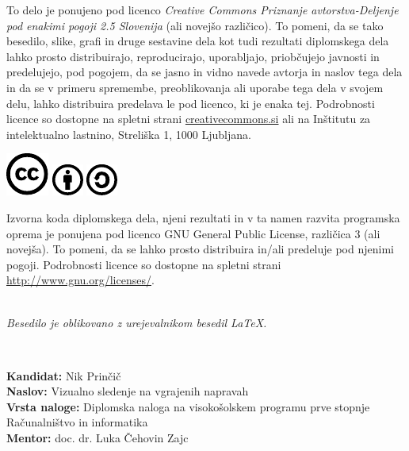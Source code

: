 \documentclass[a4paper,12pt,openright]{book}
\newcommand{\clearemptydoublepage}{\newpage{\pagestyle{empty}\cleardoublepage}}
\newcommand{\CcImageCc}[1]{%
	\includegraphics[scale=#1]{./img/common/cc_cc_30.pdf}%
}
\newcommand{\CcImageBy}[1]{%
	\includegraphics[scale=#1]{./img/common/cc_by_30.pdf}%
}
\newcommand{\CcImageSa}[1]{%
	\includegraphics[scale=#1]{./img/common/cc_sa_30.pdf}%
}
\begin{document}
\newpage
\thispagestyle{empty}

\vspace*{5cm}
{\small \noindent
    To delo je ponujeno pod licenco \textit{Creative Commons Priznanje avtorstva-Deljenje pod enakimi pogoji 2.5 Slovenija} (ali novej\v so razli\v cico).
    To pomeni, da se tako besedilo, slike, grafi in druge sestavine dela kot tudi rezultati diplomskega dela lahko prosto distribuirajo,
    reproducirajo, uporabljajo, priobčujejo javnosti in predelujejo, pod pogojem, da se jasno in vidno navede avtorja in naslov tega
    dela in da se v primeru spremembe, preoblikovanja ali uporabe tega dela v svojem delu, lahko distribuira predelava le pod
    licenco, ki je enaka tej.
    Podrobnosti licence so dostopne na spletni strani \href{http://creativecommons.si}{creativecommons.si} ali na Inštitutu za
    intelektualno lastnino, Streliška 1, 1000 Ljubljana.

    \vspace*{1cm}
    \begin{center}%
        \CcImageCc{0.741573033707865}\hspace*{1ex}\CcImageBy{1}\hspace*{1ex}\CcImageSa{1}%
    \end{center}
}

\vspace*{1cm}
{\small \noindent
    Izvorna koda diplomskega dela, njeni rezultati in v ta namen razvita programska oprema je ponujena pod licenco GNU General Public License,
    različica 3 (ali novejša). To pomeni, da se lahko prosto distribuira in/ali predeluje pod njenimi pogoji.
    Podrobnosti licence so dostopne na spletni strani \url{http://www.gnu.org/licenses/}.
}

\vfill
\begin{center}
    \ \\ \vfill
    {\em
        Besedilo je oblikovano z urejevalnikom besedil \LaTeX.}
\end{center}

\clearemptydoublepage

\thispagestyle{empty}
\
\vfill

\bigskip
\noindent\textbf{Kandidat:} Nik Prinčič\\
\noindent\textbf{Naslov:} Vizualno sledenje na vgrajenih napravah\\
\noindent\textbf{Vrsta naloge:} Diplomska naloga na visokošolskem programu prve stopnje Računalništvo in informatika \\
\noindent\textbf{Mentor:} doc. dr. Luka Čehovin Zajc\\
\end{document}
